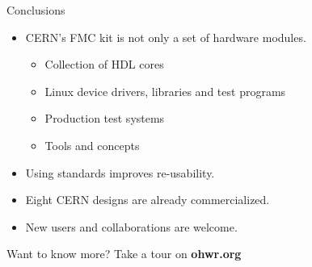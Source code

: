 \documentclass[compress,red]{beamer}
\begin{document}
\begin{frame}{Conclusions}

  \begin{block}{}
    \begin{itemize}
    \item CERN's FMC kit is not only a set of hardware modules.
      \begin{itemize}
      \item Collection of HDL cores
      \item Linux device drivers, libraries and test programs
      \item Production test systems
      \item Tools and concepts %
       \end{itemize}
    \item Using standards improves re-usability. %
    \item Eight CERN designs are already commercialized.
    \item New users and collaborations are welcome.

    \end{itemize}
  \end{block}

  \begin{block}{}
    \begin{center}
    Want to know more? Take a tour on \textbf{ohwr.org}
    \end{center}
  \end{block}

  \note[item]{}

\end{frame}
\end{document}
